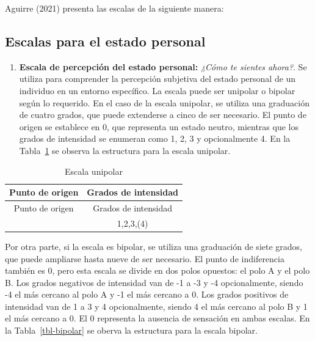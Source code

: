 \documentclass[
  12pt,
  letterpaper,
  DIV=11,
  numbers=noendperiod]{scrreport}
\providecommand{\tightlist}{%
  \setlength{\itemsep}{0pt}\setlength{\parskip}{0pt}}\usepackage{longtable,booktabs,array}
\begin{document}
Aguirre (2021) presenta las escalas de la siguiente manera:

\hypertarget{escalas-para-el-estado-personal}{%
\subsection{Escalas para el estado
personal}\label{escalas-para-el-estado-personal}}

\begin{enumerate}
\def\labelenumi{\arabic{enumi}.}
\tightlist
\item
  \textbf{Escala de percepción del estado personal:} \emph{¿Cómo te
  sientes ahora?}. Se utiliza para comprender la percepción subjetiva
  del estado personal de un individuo en un entorno específico. La
  escala puede ser unipolar o bipolar según lo requerido. En el caso de
  la escala unipolar, se utiliza una graduación de cuatro grados, que
  puede extenderse a cinco de ser necesario. El punto de origen se
  establece en 0, que representa un estado neutro, mientras que los
  grados de intensidad se enumeran como 1, 2, 3 y opcionalmente 4. En la
  Tabla~\ref{tbl-unipolar} se observa la estructura para la escala
  unipolar.
\end{enumerate}

\hypertarget{tbl-unipolar}{}
\begin{longtable}[]{@{}cc@{}}
\caption{\label{tbl-unipolar}Escala unipolar}\tabularnewline
\toprule\noalign{}
Punto de origen & Grados de intensidad \\
\midrule\noalign{}
\endfirsthead
\toprule\noalign{}
Punto de origen & Grados de intensidad \\
\midrule\noalign{}
\endhead
\bottomrule\noalign{}
\endlastfoot
0 & 1,2,3,(4) \\
\end{longtable}

Por otra parte, si la escala es bipolar, se utiliza una graduación de
siete grados, que puede ampliarse hasta nueve de ser necesario. El punto
de indiferencia también es 0, pero esta escala se divide en dos polos
opuestos: el polo A y el polo B. Los grados negativos de intensidad van
de -1 a -3 y -4 opcionalmente, siendo -4 el más cercano al polo A y -1
el más cercano a 0. Los grados positivos de intensidad van de 1 a 3 y 4
opcionalmente, siendo 4 el más cercano al polo B y 1 el más cercano a 0.
El 0 representa la ausencia de sensación en ambas escalas. En la
Tabla~\ref{tbl-bipolar} se oberva la estructura para la escala bipolar.
\end{document}
